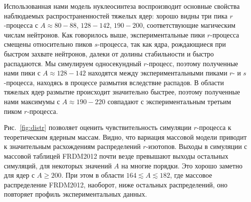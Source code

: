 Использованная нами модель нуклеосинтеза воспроизводит основные свойства наблюдаемых распространенностей тяжелых ядер: хорошо видны три пика $r$-процесса с $A \approx 80 - 88$, $128 - 142$, $190 - 200$, соответствующие магическим числам нейтронов. Как говорилось выше, экспериментальные пики $r$-процесса смещены относительно пиков $s$-процесса, так как ядра, рождающиеся при быстром захвате нейтронов, далеки от долины стабильности и быстро распадаются. Мы симулируем односекундный $r$-процесс, поэтому полученные нами пики с $A \approx 128 - 142$ находятся между экспериментальными пиками $r$- и $s$-процесса, находясь в процессе размытия вследствие распадов. В области тяжелых ядер размытие происходит значительно быстрее, поэтому полученные нами максимумы с $A \approx 190 - 220$ совпадают с экспериментальным третьим пиком $r$-процесса.

Рис.~\ref{fig:distr} позволяет оценить чувствительность симуляции $r$-процесса к теоретическим ядерным массам. Видно, что вариация массовой модели приводит к значительным расхождениям распределений $r$-изотопов. Выходы в симуляции с массовой таблицей FRDM2012 почти везде превышают выходы остальных симуляций, для некоторых значений $A$ на многие порядки. Это хорошо заметно для ядер с $A \geq 200$. При этом в области $164 \lesssim A \lesssim 182$, где массовое распределение FRDM2012, наоборот, ниже остальных распределений, оно повторяет профиль экспериментальных данных.

